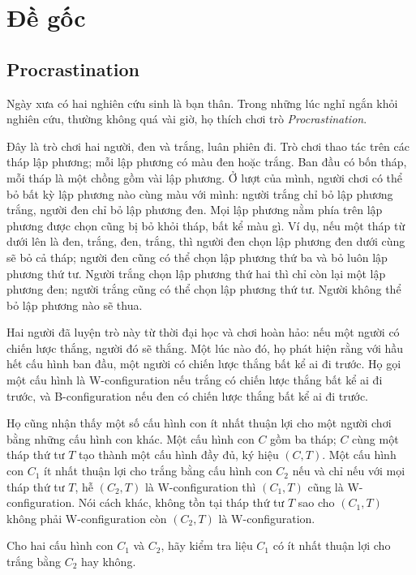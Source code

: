\documentclass[11pt]{article}
\begin{document}
\appendix
\section{Đề gốc}

\subsection{Procrastination}

Ngày xưa có hai nghiên cứu sinh là bạn thân. Trong những lúc nghỉ ngắn khỏi
nghiên cứu, thường không quá vài giờ, họ thích chơi trò \emph{Procrastination}.

Đây là trò chơi hai người, đen và trắng, luân phiên đi. Trò chơi thao tác trên
các tháp lập phương; mỗi lập phương có màu đen hoặc trắng. Ban đầu có bốn
tháp, mỗi tháp là một chồng gồm vài lập phương. Ở lượt của mình, người chơi có
thể bỏ bất kỳ lập phương nào cùng màu với mình: người trắng chỉ bỏ lập phương
trắng, người đen chỉ bỏ lập phương đen. Mọi lập phương nằm phía trên lập
phương được chọn cũng bị bỏ khỏi tháp, bất kể màu gì. Ví dụ, nếu một tháp từ
dưới lên là đen, trắng, đen, trắng, thì người đen chọn lập phương đen dưới
cùng sẽ bỏ cả tháp; người đen cũng có thể chọn lập phương thứ ba và bỏ luôn
lập phương thứ tư. Người trắng chọn lập phương thứ hai thì chỉ còn lại một lập
phương đen; người trắng cũng có thể chọn lập phương thứ tư. Người không thể
bỏ lập phương nào sẽ thua.

Hai người đã luyện trò này từ thời đại học và chơi hoàn hảo: nếu một người có
chiến lược thắng, người đó sẽ thắng. Một lúc nào đó, họ phát hiện rằng với hầu
hết cấu hình ban đầu, một người có chiến lược thắng bất kể ai đi trước. Họ gọi
một cấu hình là W-configuration nếu trắng có chiến lược thắng bất kể ai đi
trước, và B-configuration nếu đen có chiến lược thắng bất kể ai đi trước.

Họ cũng nhận thấy một số cấu hình con ít nhất thuận lợi cho một người chơi
bằng những cấu hình con khác. Một cấu hình con \(C\) gồm ba tháp; \(C\) cùng
một tháp thứ tư \(T\) tạo thành một cấu hình đầy đủ, ký hiệu \((C,T)\). Một cấu
hình con \(C_1\) ít nhất thuận lợi cho trắng bằng cấu hình con \(C_2\) nếu và
chỉ nếu với mọi tháp thứ tư \(T\), hễ \((C_2,T)\) là W-configuration thì
\((C_1,T)\) cũng là W-configuration. Nói cách khác, không tồn tại tháp thứ tư
\(T\) sao cho \((C_1,T)\) không phải W-configuration còn \((C_2,T)\) là
W-configuration.

Cho hai cấu hình con \(C_1\) và \(C_2\), hãy kiểm tra liệu \(C_1\) có ít nhất
thuận lợi cho trắng bằng \(C_2\) hay không.
\end{document}
